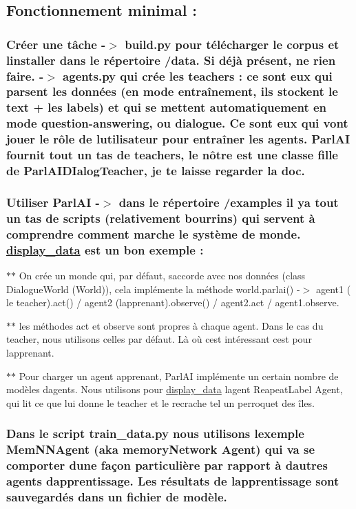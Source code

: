 \subsection*{Fonctionnement minimal \+:}

\subsubsection*{Créer une tâche -\/$>$ build.\+py pour télécharger le corpus et l\textquotesingle{}installer dans le répertoire /data. Si déjà présent, ne rien faire. -\/$>$ agents.\+py qui crée les teachers \+: ce sont eux qui parsent les données (en mode entraînement, ils stockent le text + les labels) et qui se mettent automatiquement en mode question-\/answering, ou dialogue. Ce sont eux qui vont jouer le rôle de l\textquotesingle{}utilisateur pour entraîner les agents. Parl\+AI fournit tout un tas de teachers, le nôtre est une classe fille de Parl\+A\+I\+D\+Ialog\+Teacher, je te laisse regarder la doc.}

\subsubsection*{Utiliser Parl\+AI -\/$>$ dans le répertoire /examples il y\textquotesingle{}a tout un tas de scripts (relativement bourrins) qui servent à comprendre comment marche le système de monde. \hyperlink{namespacedisplay__data}{display\+\_\+data} est un bon exemple \+:}


\begin{DoxyItemize}
\item $\ast$$\ast$ On crée un monde qui, par défaut, s\textquotesingle{}accorde avec nos données (class Dialogue\+World (World)), cela implémente la méthode world.\+parlai() -\/$>$ agent1 ( le teacher).act() / agent2 (l\textquotesingle{}apprenant).observe() / agent2.\+act / agent1.\+observe.
\item $\ast$$\ast$ les méthodes act et observe sont propres à chaque agent. Dans le cas du teacher, nous utilisons celles par défaut. Là où c\textquotesingle{}est intéressant c\textquotesingle{}est pour l\textquotesingle{}apprenant.
\item $\ast$$\ast$ Pour charger un agent apprenant, Parl\+AI implémente un certain nombre de modèles d\textquotesingle{}agents. Nous utilisons pour \hyperlink{namespacedisplay__data}{display\+\_\+data} l\textquotesingle{}agent Reapeat\+Label Agent, qui lit ce que lui donne le teacher et le recrache tel un perroquet des îles. \subsubsection*{Dans le script train\+\_\+data.\+py nous utilisons l\textquotesingle{}exemple Mem\+N\+N\+Agent (aka memory\+Network Agent) qui va se comporter d\textquotesingle{}une façon particulière par rapport à d\textquotesingle{}autres agents d\textquotesingle{}apprentissage. Les résultats de l\textquotesingle{}apprentissage sont sauvegardés dans un fichier de modèle.}
\end{DoxyItemize}


